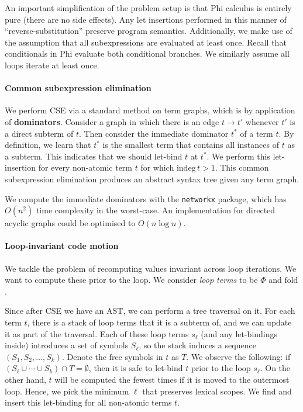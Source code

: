 An important simplification of the problem setup is that Phi calculus is entirely pure (there are no side effects). Any let insertions performed in this manner of ``reverse-substitution'' preserve program semantics. Additionally, we make use of the assumption that all subexpressions are evaluated at least once. Recall that conditionals in Phi evaluate both conditional branches. We similarly assume all loops iterate at least once.

\paragraph{Common subexpression elimination} We perform CSE via a standard method on term graphs, which is by application of \textbf{dominators}. Consider a graph in which there is an edge $t \to t'$ whenever $t'$ is a direct subterm of $t$. Then consider the immediate dominator $t^*$ of a term $t$. By definition, we learn that $t^*$ is the smallest term that contains all instances of $t$ as a subterm. This indicates that we should let-bind $t$ at $t^*$. We perform this let-insertion for every non-atomic term $t$ for which $\mathrm{indeg}\,t > 1$. This common subexpression elimination produces an abstract syntax tree given any term graph.

We compute the immediate dominators with the \texttt{networkx} package, which has $O(n^2)$ time complexity in the worst-case. An implementation for directed acyclic graphs could be optimised to $O(n \log n)$.

\paragraph{Loop-invariant code motion} We tackle the problem of recomputing values invariant across loop iterations. We want to compute these prior to the loop. We consider \textit{loop terms} to be $\Phi$ and $\mathrm{fold}$. 

Since after CSE we have an AST, we can perform a tree traversal on it. For each term $t$, there is a stack of loop terms that it is a subterm of, and we can update it as part of the traversal. Each of these loop terms $s_\ell$ (and any let-bindings inside) introduces a set of symbols $S_\ell$, so the stack induces a sequence $(S_1, S_2, \dots, S_k)$. Denote the free symbols in $t$ as $T$. We observe the following: if $\left( S_\ell \cup \cdots \cup S_k \right) \cap T = \emptyset$, then it is safe to let-bind $t$ prior to the loop $s_\ell$. On the other hand, $t$ will be computed the fewest times if it is moved to the outermost loop. Hence, we pick the minimum $\ell$ that preserves lexical scopes. We find and insert this let-binding for all non-atomic terms $t$.

